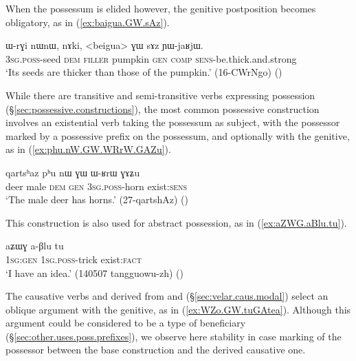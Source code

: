 When the possessum is elided however, the genitive postposition becomes obligatory, as in (\ref{ex:baigua.GW.sAz}).

\begin{exe}
\ex \label{ex:baigua.GW.sAz}
\gll ɯ-rɣi nɯnɯ, nɤki, <beigua> ɣɯ sɤz ɲɯ-jaʁjɯ. \\
\textsc{3sg}.\textsc{poss}-seed \textsc{dem} \textsc{filler}  pumpkin \textsc{gen} \textsc{comp} \textsc{sens}-be.thick.and.strong \\
\glt `Its seeds are thicker than those of the pumpkin.' (16-CWrNgo) ()
\end{exe}

While there are transitive and semi-transitive verbs expressing possession (§\ref{sec:possessive.constructions}), the most common possessive construction involves an existential verb taking the possessum as subject, with the possessor marked by a possessive prefix on the possessum, and optionally with the genitive, as in (\ref{ex:phu.nW.GW.WRrW.GAZu}). 

\begin{exe}
\ex \label{ex:phu.nW.GW.WRrW.GAZu}
\gll qartsʰaz pʰu nɯ ɣɯ ɯ-ʁrɯ ɣɤʑu \\
deer male \textsc{dem} \textsc{gen} \textsc{3sg}.\textsc{poss}-horn exist:\textsc{sens} \\
\glt `The male deer has horns.' (27-qartshAz)
()
\end{exe}

This construction is also used for abstract possession, as in (\ref{ex:aZWG.aBlu.tu}).

\begin{exe}
\ex \label{ex:aZWG.aBlu.tu}
\gll aʑɯɣ a-βlu tu \\
\textsc{1sg}:\textsc{gen} \textsc{1sg}.\textsc{poss}-trick exist:\textsc{fact} \\
\glt `I have an idea.' (140507 tangguowu-zh) 	()
\end{exe}

The causative verbs  and  derived from  and  (§\ref{sec:velar.caus.modal}) select an oblique argument with the genitive, as in (\ref{ex:WZo.GW.tuGAtea}). Although this argument could be considered to be a type of beneficiary (§\ref{sec:other.uses.poss.prefixes}), we observe here stability in case marking of the possessor between the base construction and the derived causative one.

